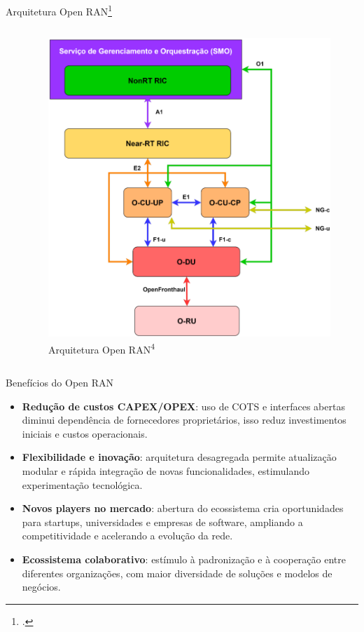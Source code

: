 \begin{frame}{Arquitetura Open RAN\footcite{marques2023desagregando}}
\begin{columns}
\begin{column}{0.5\textwidth}
\begin{itemize}
    \end{itemize}
    \end{column}
    \begin{column}{0.5\textwidth}
        \vspace{0.5cm}
        \begin{figure}
            \centering
            \includegraphics[width=\linewidth]{figs/arquitetura-openran.png}
            \caption{Arquitetura Open RAN\textsuperscript{4}}
        \end{figure}
    \end{column}
\end{columns}
\end{frame}

\begin{frame}{Benefícios do Open RAN}
\small
\begin{itemize}
  \item \textbf{Redução de custos CAPEX/OPEX}: uso de COTS e interfaces abertas diminui dependência de fornecedores proprietários, isso reduz investimentos iniciais e custos operacionais.
  \item \textbf{Flexibilidade e inovação}: arquitetura desagregada permite atualização modular e rápida integração de novas funcionalidades, estimulando experimentação tecnológica.
  \item \textbf{Novos players no mercado}: abertura do ecossistema cria oportunidades para startups, universidades e empresas de software, ampliando a competitividade e acelerando a evolução da rede.
  \item \textbf{Ecossistema colaborativo}: estímulo à padronização e à cooperação entre diferentes organizações, com maior diversidade de soluções e modelos de negócios.
\end{itemize}
\end{frame}

